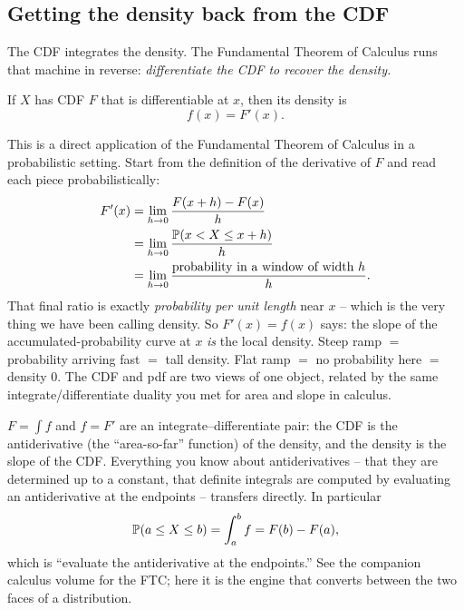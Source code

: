 \subsection{Getting the density back from the CDF}
\label{ch10:density-from-cdf}

The CDF integrates the density. The Fundamental Theorem of Calculus runs that
machine in reverse: \emph{differentiate the CDF to recover the density.}

\begin{theorem}
\label{ch10:thm-fdash}
If $X$ has CDF $F$ that is differentiable at $x$, then its density is
\[
  f(x) = F'(x) .
\]
\end{theorem}

\begin{whybox}
This is a direct application of the Fundamental Theorem of Calculus in a
probabilistic setting. Start from the definition of the derivative of $F$ and read
each piece probabilistically:
\begin{align*}
  F'(x) &= \lim_{h \to 0} \frac{F(x+h) - F(x)}{h} \\
        &= \lim_{h \to 0} \frac{\P(x < X \le x + h)}{h} \\
        &= \lim_{h \to 0} \frac{\text{probability in a window of width } h}{h}.
\end{align*}
That final ratio is exactly \emph{probability per unit length} near $x$ -- which is
the very thing we have been calling density. So $F'(x)=f(x)$ says: the slope of the
accumulated-probability curve at $x$ \emph{is} the local density. Steep ramp $=$
probability arriving fast $=$ tall density. Flat ramp $=$ no probability here $=$
density $0$. The CDF and pdf are two views of one object, related by the same
integrate/differentiate duality you met for area and slope in calculus.
\end{whybox}

\begin{connectionbox}
$F = \int f$ and $f = F'$ are an
integrate--differentiate pair: the CDF is the antiderivative (the ``area-so-far''
function) of the density, and the density is the slope of the CDF. Everything you
know about antiderivatives -- that they are determined up to a constant, that
definite integrals are computed by evaluating an antiderivative at the endpoints --
transfers directly. In particular
\[
  \P(a \le X \le b) = \int_a^b f = F(b) - F(a),
\]
which is ``evaluate the antiderivative at the endpoints.'' See the companion
calculus volume for the FTC; here it is the engine that converts between the two
faces of a distribution.
\end{connectionbox}


